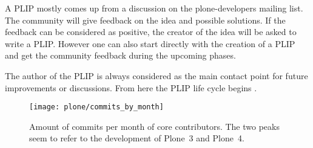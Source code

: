 A \ac{PLIP} mostly comes up from a discussion on the plone-developers mailing
list. The community will give feedback on the idea and possible solutions. If
the feedback can be considered as positive, the creator of the idea will be
asked to write a \ac{PLIP}. However one can also start directly with the
creation of a \ac{PLIP} and get the community feedback during the upcoming
phases.

The author of the \ac{PLIP} is always considered as the main contact point for
future improvements or discussions. From here the \ac{PLIP} life cycle begins
\cite{PlonePLIPLifecycle}.

\begin{figure}[htbp]
  \centering
  \texttt{[image: plone/commits\_by\_month]}
  \caption{Amount of commits per month of core contributors. The two peaks seem
  to refer to the development of Plone~3 and Plone~4.}
\end{figure}

